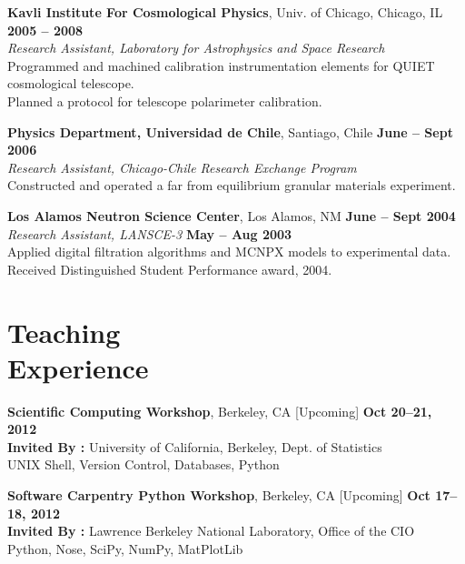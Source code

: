\documentclass[margin,line]{resume}
\begin{document}
\begin{resume}
    \textbf{Kavli Institute For Cosmological Physics}, Univ. of Chicago, Chicago, IL \hfill \textbf{2005 -- 2008}\\
                \textsl{Research Assistant, Laboratory for Astrophysics and Space Research}\\
                Programmed and machined calibration instrumentation elements for QUIET cosmological telescope.\\
                Planned a protocol for telescope polarimeter calibration.

    \textbf{Physics Department, Universidad de Chile}, Santiago, Chile \hfill \textbf{June -- Sept 2006}\\
                \textsl{Research Assistant, Chicago-Chile Research Exchange Program}\\
                 Constructed and operated a far from equilibrium granular materials experiment.

    \textbf{Los Alamos Neutron Science Center}, Los Alamos, NM \hfill \textbf{June -- Sept 2004}\\ 
                \textsl{Research Assistant, LANSCE-3} \hfill \textbf{May -- Aug 2003}\\
                Applied digital filtration algorithms and MCNPX models to experimental data.\\
		Received Distinguished Student Performance award, 2004.
    \pagebreak
    \section{\mysidestyle Teaching\\Experience}

    \textbf{Scientific Computing Workshop}, Berkeley, CA \hfill [Upcoming] \textbf{Oct 20--21, 2012}\\
               \textbf{Invited By : } University of California, Berkeley, Dept. of Statistics\\
               UNIX Shell, Version Control, Databases, Python

    \textbf{Software Carpentry Python Workshop}, Berkeley, CA \hfill [Upcoming] \textbf{Oct 17--18, 2012}\\
               \textbf{Invited By : } Lawrence Berkeley National Laboratory, Office of the CIO\\
               Python, Nose, SciPy, NumPy, MatPlotLib


\end{resume}
\end{document}
